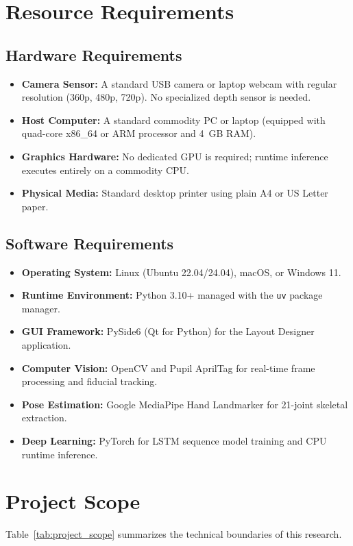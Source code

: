 \section{Resource Requirements}
\label{sec:resource_requirements}

\subsection{Hardware Requirements}
\label{subsec:hardware_req}
\begin{itemize}
    \item \textbf{Camera Sensor:} A standard USB camera or laptop webcam with regular resolution (360p, 480p, 720p). No specialized depth sensor is needed.
    \item \textbf{Host Computer:} A standard commodity PC or laptop (equipped with quad-core x86\_64 or ARM processor and 4~GB RAM).
    \item \textbf{Graphics Hardware:} No dedicated GPU is required; runtime inference executes entirely on a commodity CPU.
    \item \textbf{Physical Media:} Standard desktop printer using plain A4 or US Letter paper.
\end{itemize}

\subsection{Software Requirements}
\label{subsec:software_req}
\begin{itemize}
    \item \textbf{Operating System:} Linux (Ubuntu 22.04/24.04), macOS, or Windows 11.
    \item \textbf{Runtime Environment:} Python 3.10+ managed with the \texttt{uv} package manager.
    \item \textbf{GUI Framework:} PySide6 (Qt for Python) for the Layout Designer application.
    \item \textbf{Computer Vision:} OpenCV and Pupil AprilTag for real-time frame processing and fiducial tracking.
    \item \textbf{Pose Estimation:} Google MediaPipe Hand Landmarker for 21-joint skeletal extraction.
    \item \textbf{Deep Learning:} PyTorch for LSTM sequence model training and CPU runtime inference.
\end{itemize}

\section{Project Scope}
\label{sec:project_scope}
Table~\ref{tab:project_scope} summarizes the technical boundaries of this research.

